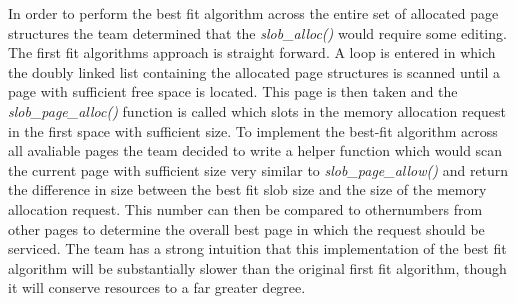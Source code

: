 \documentclass[10pt,onecolumn,draftclsnofoot]{IEEEtran} %
\begin{document}
\begin{singlespace}
  \normalfont \indent In order to perform the best fit algorithm across the entire set of allocated page structures the team determined that the \textit{slob\_alloc()} would require some editing. The first fit algorithms approach is straight forward. A loop is entered in which the doubly linked list containing the allocated page structures is scanned until a page with sufficient free space is located. This page is then taken and the \textit{slob\_page\_alloc()} function is called which slots in the memory allocation request in the first space with sufficient size. To implement the best-fit algorithm across all avaliable pages the team decided to write a helper function which would scan the current page with sufficient size very similar to \textit{slob\_page\_allow()} and return the difference in size between the best fit slob size and the size of the memory allocation request. This number can then be compared to othernumbers from other pages to determine the overall best page in which the request should be serviced. The team has a strong intuition that this implementation of the best fit algorithm will be substantially slower than the original first fit algorithm, though it will conserve resources to a far greater degree.  


\end{singlespace}
\end{document}
